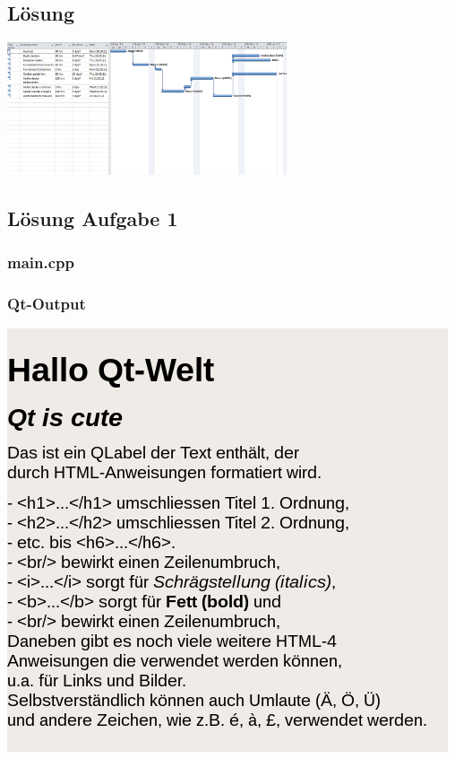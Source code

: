 \setcounter{section}{8}
\setcounter{subsection}{1}

\subsection{Lösung}
\begin{center}
	\includegraphics[angle=90,width=0.62\textwidth]{./UebLoesungen/LoesUeb08_pm2/ueb08_loesung.png}
\end{center}


\setcounter{section}{9}
\setcounter{subsection}{1}


\setcounter{section}{10}
\setcounter{subsection}{1}


\setcounter{section}{11}
\setcounter{subsection}{1}

\subsection{Lösung Aufgabe 1}
\subsubsection{main.cpp}

\subsubsection{Qt-Output}
\begin{center}
	\includegraphics[scale=.5]{./images/u11a1.png}
\end{center}


